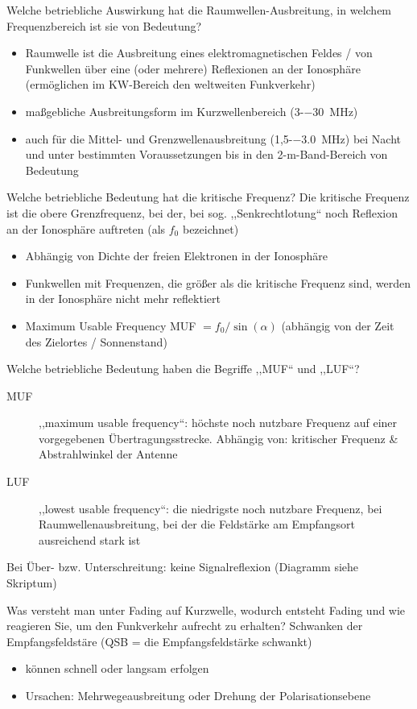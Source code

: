 \documentclass[avery5371,grid,frame,a4paper]{flashcards}
\newcommand{\card}[3]{
  \begin{flashcard}[{\chap} -- #1]{#2}#3\end{flashcard}
}
\begin{document}
\card{09}{Welche betriebliche Auswirkung hat die Raumwellen-Ausbreitung, in welchem Frequenzbereich ist sie von Bedeutung?}{
  \small
  \begin{itemize}
    \item Raumwelle ist die Ausbreitung eines elektromagnetischen Feldes / von Funkwellen über eine (oder mehrere) Reflexionen an der Ionosphäre (ermöglichen im KW-Bereich den weltweiten Funkverkehr)
    \item maßgebliche Ausbreitungsform im Kurzwellenbereich (3-\SI{-30}{\mega\Hz})
    \item auch für die Mittel- und Grenzwellenausbreitung (1,5-\SI{-3,0}{\mega\Hz}) bei Nacht und unter bestimmten Voraussetzungen bis in den 2-m-Band-Bereich von Bedeutung
  \end{itemize}
}
\card{10}{Welche betriebliche Bedeutung hat die kritische Frequenz?}{
  \small
  Die kritische Frequenz ist die obere Grenzfrequenz, bei der, bei sog. ,,Senkrechtlotung`` noch Reflexion an der Ionosphäre auftreten (als $f_0$ bezeichnet)
  \begin{itemize}
    \item Abhängig von Dichte der freien Elektronen in der Ionosphäre
    \item Funkwellen mit Frequenzen, die größer als die kritische Frequenz sind, werden in der Ionosphäre nicht mehr reflektiert
    \item Maximum Usable Frequency MUF $= f_0 / \sin(\alpha)$ (abhängig von der Zeit des Zielortes / Sonnenstand)
  \end{itemize}
}
\card{11}{Welche betriebliche Bedeutung haben die Begriffe ,,MUF`` und ,,LUF``?}{
  \small
  \begin{description}
    \item[MUF] ,,maximum usable frequency``: höchste noch nutzbare Frequenz auf einer vorgegebenen Übertragungsstrecke. Abhängig von: kritischer Frequenz \& Abstrahlwinkel der Antenne
    \item[LUF] ,,lowest usable frequency``: die niedrigste noch nutzbare Frequenz, bei Raumwellenausbreitung, bei der die Feldstärke am Empfangsort ausreichend stark ist
  \end{description}
  Bei Über- bzw. Unterschreitung: keine Signalreflexion (Diagramm siehe Skriptum)
}
\card{12}{Was versteht man unter Fading auf Kurzwelle, wodurch entsteht Fading und wie reagieren Sie, um den Funkverkehr aufrecht zu erhalten?}{
  Schwanken der Empfangsfeldstäre (QSB = die Empfangsfeldstärke schwankt)
  \begin{itemize}
    \item können schnell oder langsam erfolgen
    \item Ursachen: Mehrwegeausbreitung oder Drehung der Polarisationsebene
  \end{itemize}
}
\end{document}
